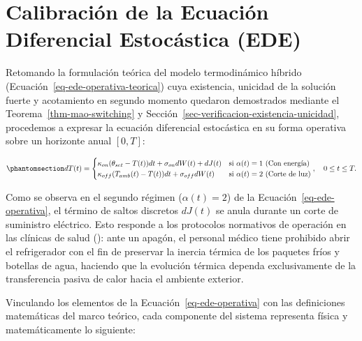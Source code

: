 \documentclass[
  spanish,
  us-letterpaper,
]{scrreprt}
\numberwithin{equation}{section}
\theoremstyle{plain}
\theoremstyle{plain}
\theoremstyle{plain}
\theoremstyle{definition}
\theoremstyle{remark}
\begin{document}
\section{Calibración de la Ecuación Diferencial Estocástica
(EDE)}\label{calibraciuxf3n-de-la-ecuaciuxf3n-diferencial-estocuxe1stica-ede}

Retomando la formulación teórica del modelo termodinámico híbrido
(Ecuación~\ref{eq-ede-operativa-teorica}) cuya existencia, unicidad de
la solución fuerte y acotamiento en segundo momento quedaron demostrados
mediante el Teorema~\ref{thm-mao-switching} y
Sección~\ref{sec-verificacion-existencia-unicidad}, procedemos a
expresar la ecuación diferencial estocástica en su forma operativa sobre
un horizonte anual \([0, T]\):

\begin{equation}\phantomsection\label{eq-ede-operativa}{
dT(t) = 
\begin{cases} 
\kappa_{on}(\theta_{set} - T(t))dt + \sigma_{on}dW(t) + dJ(t) & \text{si } \alpha(t) = 1 \text{ (Con energía)} \\ 
\kappa_{off}(T_{amb}(t) - T(t))dt + \sigma_{off}dW(t) & \text{si } \alpha(t) = 2 \text{ (Corte de luz)} 
\end{cases}, \quad 0 \leq t \leq T.
}\end{equation}

Como se observa en el segundo régimen (\(\alpha(t) = 2\)) de la
Ecuación~\ref{eq-ede-operativa}, el término de saltos discretos
\(dJ(t)\) se anula durante un corte de suministro eléctrico. Esto
responde a los protocolos normativos de operación en las clínicas de
salud (): ante un apagón, el personal médico tiene prohibido abrir el
refrigerador con el fin de preservar la inercia térmica de los paquetes
fríos y botellas de agua, haciendo que la evolución térmica dependa
exclusivamente de la transferencia pasiva de calor hacia el ambiente
exterior.

Vinculando los elementos de la Ecuación~\ref{eq-ede-operativa} con las
definiciones matemáticas del marco teórico, cada componente del sistema
representa física y matemáticamente lo siguiente:
\end{document}
